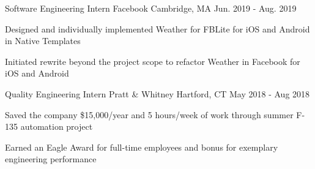 


\begin{cventries}


\cventry
{Software Engineering Intern} %
{Facebook} %
{Cambridge, MA} %
{Jun. 2019 - Aug. 2019} %
{ %
\begin{cvitems}
\item {Designed and individually implemented Weather for FBLite for iOS and Android in Native Templates}
\item {Initiated rewrite beyond the project scope to refactor Weather in Facebook for iOS and Android}
\end{cvitems}
}


\cventry
{Quality Engineering Intern} %
{Pratt \& Whitney} %
{Hartford, CT} %
{May 2018 - Aug 2018} %
{ %
\begin{cvitems}
\item {Saved the company \$15,000/year and 5 hours/week of work through summer F-135 automation project}
\item {Earned an Eagle Award for full-time employees and bonus for exemplary engineering performance}
\end{cvitems}
}


\end{cventries}